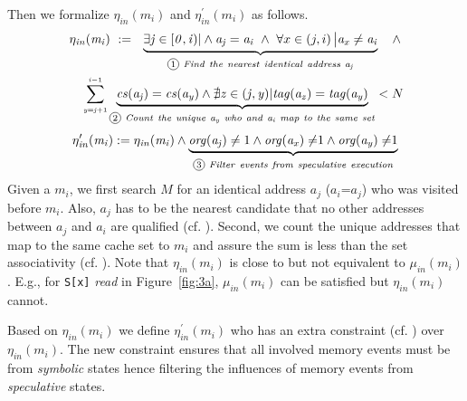\documentclass[sigconf]{acmart}
\newcommand*\circled[1]{\tikz[baseline=(char.base)]{
				\node[shape=circle,draw,inner sep=1pt] (char) {\scriptsize{#1}};}}
\begin{document}
Then we formalize $\mathit{\eta_{in}(m_i)}$ and $\mathit{\eta^\prime_{in}(m_i)}$ as follows. 
%
\begin{multline}
  \label{eqn:hc1}
    \mathit{\eta_{in}(m_i)}~:=~~ 
     \underbrace{ 
      \exists\mathit{j}\in[\mathit{0,i})|
      \wedge 
      \mathit{a_j}=\mathit{a_i} 
    ~\wedge~
      {\forall}x\in\left(j,i\right)\big|\mathit{a_x}\ne\mathit{a_i}
    }_{{\circled{1}}\mathit{~Find~the~nearest~identical~address~a_j}}
		~~~\wedge 
		\\
    ~~~~\sum_{{\scriptscriptstyle \mathit{y=j}+1}}^{{\scriptscriptstyle \mathit{i-}1}} 
    \underbrace{
      \mathit{cs(a_j)}=\mathit{cs(a_y)} 
      \wedge
      \nexists\mathit{z}\in(\mathit{j,y})|\mathit{tag(a_z)}=\mathit{tag(a_y)}
    }_{{\circled{2}}\mathit{~Count~the~unique~a_y~who~and~a_i~map~to~the~same~set}}
    <N
\end{multline}
\vspace{.2ex}
\begin{multline}
  \label{eqn:hc2}
    \mathit{\eta^\prime_{in}(m_i)}:=\mathit{\eta_{in}(m_i)}\wedge
    \underbrace{
      \mathit{org(a_j)}\ne1 
      \wedge
      \mathit{org(a_x)\ne}1 
      \wedge
      \mathit{org(a_y)\ne}1 
    }_{{\circled{3}}\mathit{~Filter~events~from~speculative~execution}}
\end{multline}
%
%
Given a $\mathit{m_i}$, we first search $\mathit{M}$ for an identical 
address $\mathit{a_j}$ ($\mathit{a_i}$=$\mathit{a_j}$) who was 
visited before $\mathit{m_i}$. Also, $\mathit{a_j}$ has to be the nearest 
candidate that no other addresses between $\mathit{a_j}$ and $\mathit{a_i}$ 
are qualified (cf. \circled{1}). Second, we count the unique addresses that 
map to the same cache set to $\mathit{m_i}$ and assure the sum is less than 
the set associativity (cf. \circled{2}). Note that $\mathit{\eta_{in}(m_i)}$ 
is close to but not equivalent to $\mathit{\mu_{in}(m_i)}$. E.g., for 
\texttt{S[x]} \textit{read} in Figure~\ref{fig:3a}, $\mathit{\mu_{in}(m_i)}$ 
can be satisfied but $\mathit{\eta_{in}(m_i)}$ cannot.

Based on $\mathit{\eta_{in}(m_i)}$ we define $\mathit{\eta^\prime_{in}(m_i)}$
who has an extra constraint (cf. \circled{3}) over $\mathit{\eta_{in}(m_i)}$. 
The new constraint ensures that all involved memory events must be from 
\textit{symbolic} states hence filtering the influences of memory events 
from \textit{speculative} states.
\end{document}
